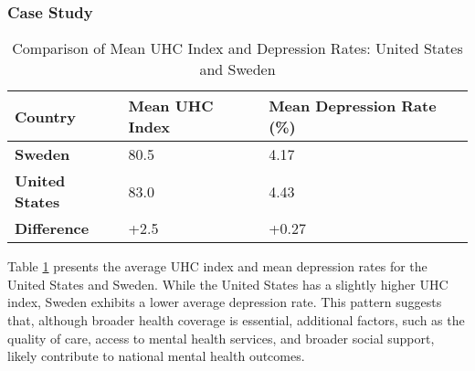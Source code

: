 \subsubsection{Case Study}
\begin{table}
\centering
\caption{Comparison of Mean UHC Index and Depression Rates: United States and Sweden}
\label{tab:mean_uhc}
\begin{tabular}{|l |l |l|}\hline
Country & Mean UHC Index & Mean Depression Rate (\%) \\\hline

\textbf{Sweden} & 80.5 & 4.17 \\\hline
\textbf{United States} & 83.0 & 4.43 \\\hline
\textbf{Difference} & +2.5 & +0.27 \\ \hline

\end{tabular}

\end{table}

Table \ref{tab:mean_uhc} presents the average UHC index and mean depression rates for the United States and Sweden. While the United States has a slightly higher UHC index, Sweden exhibits a lower average depression rate. This pattern suggests that, although broader health coverage is essential, additional factors, such as the quality of care, access to mental health services, and broader social support, likely contribute to national mental health outcomes.